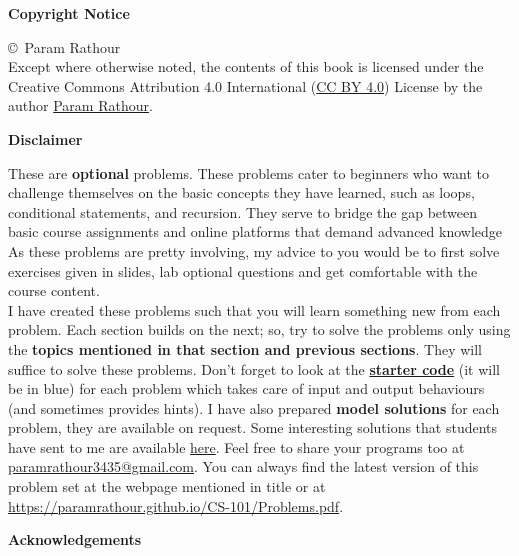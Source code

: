 \documentclass[../Problems]{subfiles}
\begin{document}
\begin{center}
	\textbf{\Large{Copyright Notice}}
\end{center}
\copyright\ Param Rathour\\
Except where otherwise noted, the contents of this book is licensed under the Creative Commons Attribution 4.0 International (\href{https://creativecommons.org/licenses/by/4.0/}{CC BY 4.0}) License by the author \href{https://paramrathour.github.io/}{Param Rathour}.
\begin{center}
	\textbf{\Large{Disclaimer}}
\end{center}
These are \textbf{optional} problems.
These problems cater to beginners who want to challenge themselves on the basic concepts they have learned, such as loops, conditional statements, and recursion. They serve to bridge the gap between basic course assignments and online platforms that demand advanced knowledge
As these problems are pretty involving, my advice to you would be to first solve exercises given in slides, lab optional questions and get comfortable with the course content.\\
I have created these problems such that you will learn something new from each problem. Each section builds on the next; so, try to solve the problems only using the \textbf{topics mentioned in that section and previous sections}. They will suffice to solve these problems. Don't forget to look at the \href{https://github.com/paramrathour/CS-101/tree/main/Starter%20Codes}{\textbf{starter code}} (it will be in blue) for each problem which takes care of input and output behaviours (and sometimes provides hints). I have also prepared \textbf{model solutions} for each problem, they are available on request. Some interesting solutions that students have sent to me are available \href{https://paramrathour.github.io/CS101/Solutions}{here}. Feel free to share your programs too at \href{mailto:paramrathour3435@gmail.com}{paramrathour3435@gmail.com}. You can always find the latest version of this problem set at the webpage mentioned in title or at \href{https://paramrathour.github.io/CS-101/Problems.pdf}{https://paramrathour.github.io/CS-101/Problems.pdf}.
\begin{center}
	\textbf{\Large{Acknowledgements}}
\end{center}
\end{document}
